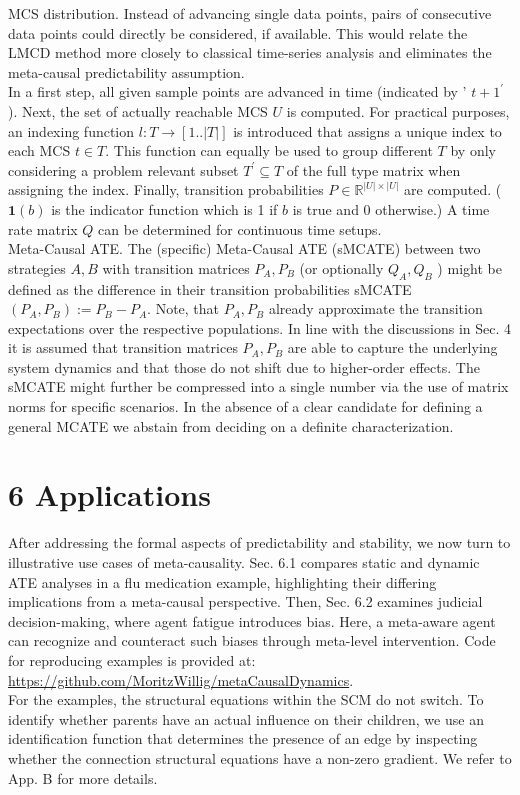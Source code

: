 \documentclass[10pt]{article}
\begin{document}
MCS distribution. Instead of advancing single data points, pairs of consecutive data points could directly be considered, if available. This would relate the LMCD method more closely to classical time-series analysis and eliminates the meta-causal predictability assumption.\\
In a first step, all given sample points are advanced in time (indicated by ' $t+1^{\prime}$ ). Next, the set of actually reachable MCS $U$ is computed. For practical purposes, an indexing function $l: T \rightarrow[1 . .|T|]$ is introduced that assigns a unique index to each MCS $t \in T$. This function can equally be used to group different $T$ by only considering a problem relevant subset $T^{\prime} \subseteq T$ of the full type matrix when assigning the index. Finally, transition probabilities $P \in \mathbb{R}^{|U| \times|U|}$ are computed. ( $\mathbf{1}(b)$ is the indicator function which is 1 if $b$ is true and 0 otherwise.) A time rate matrix $Q$ can be determined for continuous time setups.\\
Meta-Causal ATE. The (specific) Meta-Causal ATE (sMCATE) between two strategies $A, B$ with transition matrices $P_{A}, P_{B}$ (or optionally $Q_{A}, Q_{B}$ ) might be defined as the difference in their transition probabilities sMCATE $\left(P_{A}, P_{B}\right):=P_{B}-P_{A}$. Note, that $P_{A}, P_{B}$ already approximate the transition expectations over the respective populations. In line with the discussions in Sec. 4 it is assumed that transition matrices $P_{A}, P_{B}$ are able to capture the underlying system dynamics and that those do not shift due to higher-order effects. The sMCATE might further be compressed into a single number via the use of matrix norms for specific scenarios. In the absence of a clear candidate for defining a general MCATE we abstain from deciding on a definite characterization.

\section*{6 Applications}
After addressing the formal aspects of predictability and stability, we now turn to illustrative use cases of meta-causality. Sec. 6.1 compares static and dynamic ATE analyses in a flu medication example, highlighting their differing implications from a meta-causal perspective. Then, Sec. 6.2 examines judicial decision-making, where agent fatigue introduces bias. Here, a meta-aware agent can recognize and counteract such biases through meta-level intervention. Code for reproducing examples is provided at: \href{https://github.com/MoritzWillig/metaCausalDynamics}{https://github.com/MoritzWillig/metaCausalDynamics}.\\
For the examples, the structural equations within the SCM do not switch. To identify whether parents have an actual influence on their children, we use an identification function that determines the presence of an edge by inspecting whether the connection structural equations have a non-zero gradient. We refer to App. B for more details.
\end{document}
